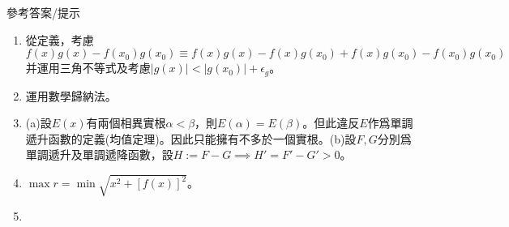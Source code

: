 \documentclass[12pt]{article}
\begin{document}
    \begin{center}
        參考答案/提示
    \end{center}
    \begin{enumerate}
        \item 從定義，考慮$f(x)g(x)-f(x_0)g(x_0)\equiv f(x)g(x)-f(x)g(x_0)+f(x)g(x_0)-f(x_0)g(x_0)$并運用三角不等式及考慮$|g(x)|<|g(x_0)|+\epsilon_g$。
        \item 運用數學歸納法。
        \item (a)設$E(x)$有兩個相異實根$\alpha<\beta$，則$E(\alpha)=E(\beta)$。但此違反$E$作爲單調遞升函數的定義(均值定理)。因此只能擁有不多於一個實根。(b)設$F,G$分別爲單調遞升及單調遞降函數，設$H:=F-G\implies H'=F'-G'>0$。
        \item $\max r = \min \sqrt{x^2+[f(x)]^2}$。
        \item 
    \end{enumerate}
\end{document}
